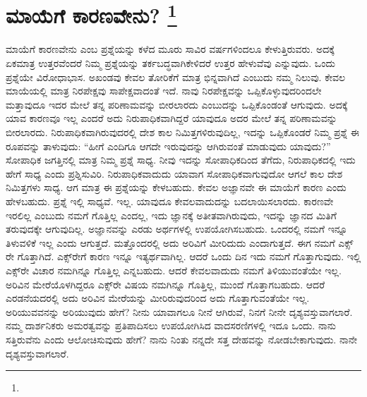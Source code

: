 
\chapter[ಮಾಯೆಗೆ ಕಾರಣವೇನು? ]{ಮಾಯೆಗೆ ಕಾರಣವೇನು? \protect\footnote{}}

ಮಾಯೆಗೆ ಕಾರಣವೇನು ಎಂಬ ಪ್ರಶ್ನೆಯನ್ನು ಕಳೆದ ಮೂರು ಸಾವಿರ ವರ್ಷಗಳಿಂದಲೂ ಕೇಳುತ್ತಿರುವರು. ಅದಕ್ಕೆ ಏಕಮಾತ್ರ ಉತ್ತರವೆಂದರೆ ನಿಮ್ಮ ಪ್ರಶ್ನೆಯನ್ನು ತರ್ಕಬದ್ಧವಾಗಿ\break ಕೇಳಿದರೆ ಉತ್ತರ ಹೇಳುವೆವು ಎನ್ನುವುದು. ಒಂದು ಪ್ರಶ್ನೆಯೇ ವಿರೋಧಾಭಾಸ. ಅಖಂಡವು ಕೇವಲ ತೋರಿಕೆಗೆ ಮಾತ್ರ ಭಿನ್ನವಾಗಿದೆ ಎಂಬುದು ನಮ್ಮ ನಿಲುವು. ಕೇವಲ ಮಾಯೆಯಲ್ಲಿ ಮಾತ್ರ ನಿರಪೇಕ್ಷವು ಸಾಪೇಕ್ಷವಾದಂತೆ ಇದೆ. ನಾವು ನಿರಪೇಕ್ಷವನ್ನು ಒಪ್ಪಿಕೊಳ್ಳುವುದರಿಂದಲೇ ಮತ್ತಾವುದೂ ಇದರ ಮೇಲೆ ತನ್ನ ಪರಿಣಾಮವನ್ನು ಬೀರಲಾರದು ಎಂಬುದನ್ನು ಒಪ್ಪಿಕೊಂಡಂತೆ ಆಗುವುದು. ಅದಕ್ಕೆ ಯಾವ ಕಾರಣವೂ ಇಲ್ಲ ಎಂದರೆ ಅದು ನಿರುಪಾಧಿಕವಾಗಿದ್ದರೆ ಯಾವುದೂ ಅದರ ಮೇಲೆ ತನ್ನ ಪರಿಣಾಮವನ್ನು ಬೀರಲಾರದು. ನಿರುಪಾಧಿಕವಾಗಿರುವುದರಲ್ಲಿ ದೇಶ ಕಾಲ ನಿಮಿತ್ತಗಳಿರುವುದಿಲ್ಲ, ಇದನ್ನು ಒಪ್ಪಿಕೊಂಡರೆ ನಿಮ್ಮ ಪ್ರಶ್ನೆ ಈ ರೂಪವನ್ನು ತಾಳುವುದು: “ಹೀಗೆ ಎಂದಿಗೂ ಆಗದೇ ಇರುವುದನ್ನು ಆಗಿರುವಂತೆ ಮಾಡುವುದು ಯಾವುದು?” ಸೋಪಾಧಿಕ ಜಗತ್ತಿನಲ್ಲಿ ಮಾತ್ರ ನಿಮ್ಮ ಪ್ರಶ್ನೆ ಸಾಧ್ಯ. ನೀವು ಇದನ್ನು ಸೋಪಾಧಿಕದಿಂದ ತೆಗೆದು, ನಿರುಪಾಧಿಕದಲ್ಲಿ ಇದು ಹೇಗೆ ಸಾಧ್ಯ ಎಂದು ಪ್ರಶ್ನಿಸುವಿರಿ. ನಿರುಪಾಧಿಕವಾದುದು ಯಾವಾಗ ಸೋಪಾಧಿಕವಾಗುವುದೋ ಆಗಲೆ ಕಾಲ ದೇಶ ನಿಮಿತ್ತಗಳು ಸಾಧ್ಯ. ಆಗ ಮಾತ್ರ ಈ ಪ್ರಶ್ನೆಯನ್ನು ಕೇಳಬಹುದು. ಕೇವಲ ಅಜ್ಞಾನವೇ ಈ ಮಾಯೆಗೆ ಕಾರಣ ಎಂದು ಹೇಳಬಹುದು. ಪ್ರಶ್ನೆ ಇಲ್ಲಿ ಸಾಧ್ಯವೆ. ಇಲ್ಲ. ಯಾವುದೂ ಕೇವಲವಾದುದನ್ನು ಬದಲಾಯಿಸಲಾರದು. ಕಾರಣವೇ ಇರಲಿಲ್ಲ ಎಂಬುದು ನಮಗೆ ಗೊತ್ತಿಲ್ಲ ಎಂದಲ್ಲ, ಇದು ಜ್ಞಾನಕ್ಕೆ ಅತೀತವಾಗಿರುವುದು, ಇದನ್ನು ಜ್ಞಾನದ ಮಿತಿಗೆ ತರುವುದಕ್ಕೇ ಆಗುವುದಿಲ್ಲ. ಅಜ್ಞಾನವನ್ನು ಎರಡು ಅರ್ಥಗಳಲ್ಲಿ ಉಪಯೋಗಿಸಬಹುದು. ಒಂದರಲ್ಲಿ ನಮಗೆ ಇನ್ನೂ ತಿಳುವಳಿಕೆ ಇಲ್ಲ ಎಂದು ಆಗುತ್ತದೆ. ಮತ್ತೊಂದರಲ್ಲಿ ಅದು ಅರಿವಿಗೆ ಮೀರಿದುದು ಎಂದಾಗುತ್ತದೆ. ಈಗ ನಮಗೆ ಎಕ್ಸ್​ರೇ ಗೊತ್ತಾಗಿದೆ. ಎಕ್ಸ್​ರೇಗೆ ಕಾರಣ ಇನ್ನೂ ಇತ್ಯರ್ಥವಾಗಿಲ್ಲ. ಆದರೆ ಒಂದು ದಿನ ಇದು ನಮಗೆ ಗೊತ್ತಾಗುವುದು. ಇಲ್ಲಿ ಎಕ್ಸ್​ರೇ ವಿಚಾರ ನಮಗಿನ್ನೂ ಗೊತ್ತಿಲ್ಲ ಎನ್ನಬಹುದು. ಆದರೆ ಕೇವಲವಾದುದು ನಮಗೆ ತಿಳಿಯುವಂತೆಯೇ ಇಲ್ಲ. ಅರಿವಿನ ಮೇರೆಯೊಳಗಿದ್ದರೂ ಎಕ್ಸ್​ರೇ ವಿಷಯ ನಮಗಿನ್ನೂ ಗೊತ್ತಿಲ್ಲ, ಮುಂದೆ ಗೊತ್ತಾಗಬಹುದು. ಆದರೆ ಎರಡನೆಯದರಲ್ಲಿ ಅದು ಅರಿವಿನ ಮೇರೆಯನ್ನು ಮೀರಿರುವುದರಿಂದ ಅದು ಗೊತ್ತಾಗುವಂತೆಯೇ ಇಲ್ಲ. ಅರಿಯುವವನನ್ನು ಅರಿಯುವುದು ಹೇಗೆ? ನೀನು ಯಾವಾಗಲೂ ನೀನೆ ಆಗಿರುವೆ, ನಿನಗೆ ನೀನೇ ದೃಶ್ಯವಸ್ತುವಾಗಲಾರೆ. ನಮ್ಮ ದಾರ್ಶನಿಕರು ಅಮರತ್ವವನ್ನು ಪ್ರತಿಪಾದಿಸಲು ಉಪಯೋಗಿಸಿದ ವಾದಸರಣಿಗಳಲ್ಲಿ ಇದೂ ಒಂದು. ನಾನು ಸತ್ತಿರುವೆನು ಎಂದು ಆಲೋಚಿಸುವುದು ಹೇಗೆ? ನಾನು ನಿಂತು ನನ್ನದೇ ಸತ್ತ ದೇಹವನ್ನು ನೋಡಬೇಕಾಗುವುದು. ನಾನೇ ದೃಶ್ಯವಸ್ತುವಾಗಲಾರೆ.

\vspace{-0.5cm}

